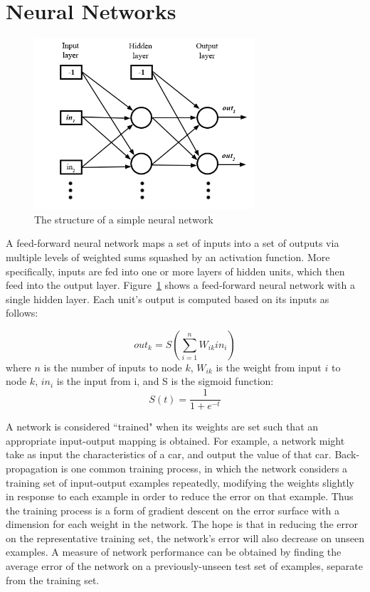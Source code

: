\documentclass[10pt, conference, compsocconf]{IEEEtran}
\newcommand{\sigmoid}{$$S(t)=\frac{1}{1+e^{-t}}$$}
\begin{document}
\section{Neural Networks}

\begin{figure}
\begin{center}
\includegraphics[width=.95\linewidth,height=2.5in]{neuralnetwork.png}
\end{center}
\caption{The structure of a simple neural network}
\label{fig:NN}
\end{figure}


A feed-forward neural network \cite{AImodern} maps a set of inputs into a set of outputs via multiple levels of weighted sums squashed by an activation function. More specifically, inputs are fed into one or more layers of hidden units, which then feed into the output layer. Figure~\ref{fig:NN} shows a feed-forward neural network with a single hidden layer. Each unit's output is computed based on its inputs as follows: 

$$
out_k = S(\sum_{i=1}^n W_{ik}in_{i})
$$
where $n$ is the number of inputs to node $k$, $W_{ik}$ is the weight from input $i$ to node $k$, $in_{i}$ is the input from i, and S is the sigmoid function:
\sigmoid

A network is considered ``trained" when its weights are set such that an appropriate input-output mapping is obtained. For example, a network might take as input the characteristics of a car, and output the value of that car. Back-propagation \cite{AImodern} is one common training process, in which the network considers a training set of input-output examples repeatedly, modifying the weights slightly in response to each example in order to reduce the error on that example. Thus the training process is a form of gradient descent on the error surface with a dimension for each weight in the network. The hope is that in reducing the error on the representative training set, the network's error will also decrease on unseen examples. A measure of network performance can be obtained by finding the average error of the network on a previously-unseen test set of examples, separate from the training set.
\end{document}
